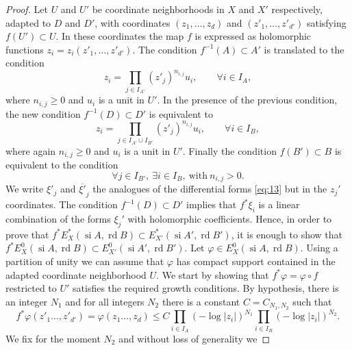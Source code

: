 \documentclass[11pt,a4paper]{amsart}
\DeclareMathOperator{\si}{si}
\DeclareMathOperator{\rd}{rd}
\numberwithin{equation}{section}
\theoremstyle{plain}
\theoremstyle{definition}
\begin{document}
\begin{proof}
  Let $U$ and $U'$ be coordinate neighborhoods in $X$ and $X'$
  respectively, adapted to $D$ and $D'$, with coordinates $(z_{1},\dots,
  z_d)$ and 
  $(z'_{1},\dots, z'_{d'})$ satisfying $f(U')\subset U$. In these
  coordinates the map $f$ is expressed as holomorphic functions
  $z_i=z_i(z'_{1},\dots ,z'_{d'})$. The condition $f^{-1}(A)\subset
  A'$ is translated to the condition
  \begin{equation}\label{eq:39}
    z_i=\prod_{j\in I_{A'}}(z'_{j})^{n_{i,j}}u_i, \qquad \forall i\in I_{A},
  \end{equation}
  where $n_{i,j}\ge 0$ and $u_i$ is a unit in $U'$. In the presence of
  the previous condition, the new condition $f^{-1}(D)\subset D'$ is
  equivalent to  
  \begin{equation}\label{eq:40}
    z_i=\prod_{j\in I_{A'}\cup I_{B'}}(z'_{j})^{n_{i,j}}u_i, \qquad
    \forall i\in I_{B}, 
  \end{equation}
  where again $n_{i,j}\ge 0$ and $u_i$ is a unit in $U'$. Finally the
  condition $f(B')\subset B$ is equivalent to the condition
  \begin{equation}
    \label{eq:41}
    \forall j\in I_{B'},\ \exists i\in I_{B},\ \text{with}\ n_{i,j}>0.
  \end{equation}
  We write $\xi'_{j}$ and $\overline{\xi'}_{j}$ the analogues of the
  differential forms \eqref{eq:13} but in the $z_j'$ coordinates. The
  condition $f^{-1}(D)\subset D'$ implies that $f^{\ast}\xi_{i}$ is a
  linear combination of the forms $\xi_{j}'$ with holomorphic
  coefficients. Hence, in order to prove  that
  $f^{\ast}E^{\ast}_{X}(\si A,\rd B)\subset E^{\ast}_{X'}(\si A',\rd
  B')$, it is enough to show that $f^{\ast}E^{0}_{X}(\si A,\rd B)\subset E^{0}_{X'}(\si A',\rd
  B')$. Let $\varphi\in E^{0}_{X}(\si A,\rd B)$. Using a partition of
  unity we can assume that $\varphi$ has compact support contained in
  the adapted coordinate neighborhood $U$. We start by showing that
  $f^{\ast}\varphi=\varphi\circ f$ restricted to $U'$ satisfies the
  required growth conditions. By hypothesis, there is an integer
  $N_{1}$ and for all integers $N_{2}$ there is a constant
  $C=C_{N_{1},N_{2}}$ such that 
  \begin{displaymath}
    f^{\ast}\varphi(z'_{1}\dots,z'_{d'})
    = \varphi(z_{1}\dots,z_{d})
    \le C\prod_{i\in I_{A}} (-\log|z_{i}|)^{N_{1}}
    \prod_{i\in I_{B}} (-\log|z_{i}|)^{N_{2}}.
  \end{displaymath}
  We fix for the moment $N_{2}$ and without loss of generality we

\end{proof}
\end{document}
